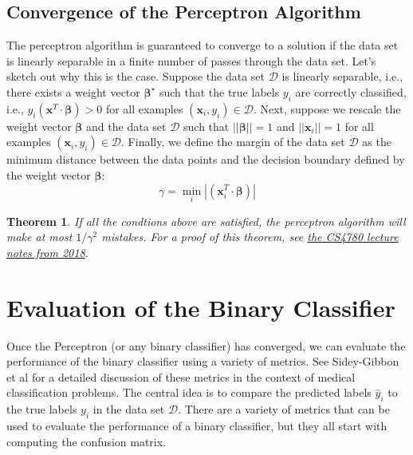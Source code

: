\documentclass{article}[11pt]
\newtheorem{theorem}{Theorem}
\newcommand{\norm}[1]{\left|\left|#1\right|\right|}
\begin{document}
\subsection{Convergence of the Perceptron Algorithm}
The perceptron algorithm is guaranteed to converge to a solution if the data set is linearly separable in a finite number of passes through the data set.
Let's sketch out why this is the case.
Suppose the data set $\mathcal{D}$ is linearly separable, i.e., there exists a weight vector $\mathbf{\beta}^{\star}$ such that the true labels $y_{i}$ are correctly classified, i.e., 
$y_{i}\left(\mathbf{x}^{T}\cdot\mathbf{\beta}\right)>0$ for all examples $(\mathbf{x}_{i},y_{i})\in\mathcal{D}$.
Next, suppose we rescale the weight vector $\mathbf{\beta}$ and the data set $\mathcal{D}$ such that $\norm{\mathbf{\beta}}=1$ and $\norm{\mathbf{x}_{i}}=1$ for all examples $(\mathbf{x}_{i},y_{i})\in\mathcal{D}$.
Finally, we define the margin of the data set $\mathcal{D}$ as the minimum distance between the data points and the decision boundary defined by the weight vector $\mathbf{\beta}$:
\begin{equation*}
    \gamma = \min_{i}|\left(\mathbf{x}_{i}^{T}\cdot\mathbf{\beta}\right)|
\end{equation*}
\begin{theorem}\label{thm:perceptron}
If all the condtions above are satisfied, the perceptron algorithm will make at most $1/\gamma^{2}$ mistakes.
For a proof of this theorem, see \href{https://www.cs.cornell.edu/courses/cs4780/2018fa/lectures/lecturenote03.html}{the CS4780 lecture notes from 2018}.
\end{theorem}



\section{Evaluation of the Binary Classifier}
Once the Perceptron (or any binary classifier) has converged, we can evaluate the performance of the binary classifier using a variety of metrics.
See Sidey-Gibbon et al \cite{SG2019} for a detailed discussion of these metrics in the context of medical classification problems.
The central idea is to compare the predicted labels $\hat{y}_{i}$ to the true labels $y_{i}$ in the data set $\mathcal{D}$. 
There are a variety of metrics that can be used to evaluate the performance of a binary classifier, but they all start with computing the confusion matrix.
\end{document}
